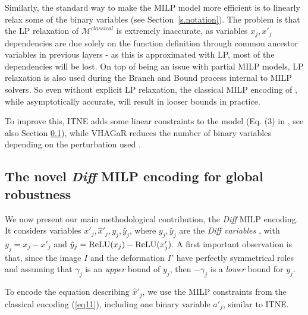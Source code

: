 	Similarly, the standard way to make the MILP model more efficient is to linearly relax some of the binary variables (see Section~\ref{s.notation}). The problem is that the LP relaxation of $\mathcal{M}^{classical}$ is extremely inaccurate, as variables $x_j,x'_j$ dependencies are due solely on the function definition through common ancestor variables in previous layers - as this is approximated with LP, most of the dependencies will be lost. On top of being an issue with partial MILP models, LP relaxation is also used during the Branch and Bound process internal to MILP solvers. 
	So even without explicit LP relaxation, the classical MILP encoding of \cite{MILP}, while asymptotically accurate, will result in looser bounds in practice. 
	
	To improve this, ITNE adds some linear constraints to the model (Eq. (3) in \cite{ITNE}, see also Section \ref{s.diff}), while VHAGaR reduces the number of binary variables depending on the perturbation used \cite{vhagar}.
	
	


	
	
	


	


	\subsection{The novel {\em Diff} MILP encoding for global robustness}
	\label{s.diff}

	We now present our main methodological contribution, the {\em Diff} MILP encoding. It considers variables $x'_j,\hat{x}'_j, y_j, \hat{y}_j$, where $y_j, \hat{y}_j$ are the {\em Diff variables} \cite{diff}, with 
	$y_j = x_j - x'_j$ and $\hat{y}_j= \mathrm{ReLU}({x}_j) - \mathrm{ReLU}(x'_j)$. 
	A first important observation is that, since the image $I$ and the deformation $I'$ have perfectly symmetrical roles and assuming that $\gamma_j$ is an {\em upper} bound of $y_j$, then $-\gamma_j$ is a {\em lower} bound for $y_j$.


	To encode the equation describing $\hat{x}'_j$, we use 
	the MILP constraints from the classical encoding (\ref{eq11}), including
	one binary variable $a'_j$, similar to ITNE.

